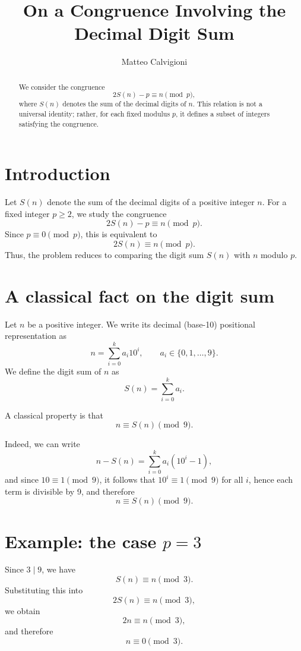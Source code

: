 \documentclass[11pt,a4paper]{article}
\title{On a Congruence Involving the Decimal Digit Sum}
\author{Matteo Calvigioni}
\date{}
\theoremstyle{definition}
\begin{document}
\maketitle

\begin{abstract}
We consider the congruence
\[
2S(n) - p \equiv n \pmod{p},
\]
where \(S(n)\) denotes the sum of the decimal digits of \(n\).
This relation is not a universal identity; rather, for each fixed modulus \(p\),
it defines a subset of integers satisfying the congruence.
\end{abstract}

\section{Introduction}

Let \(S(n)\) denote the sum of the decimal digits of a positive integer \(n\).
For a fixed integer \(p \ge 2\), we study the congruence
\[
2S(n) - p \equiv n \pmod{p}.
\]
Since \(p \equiv 0 \pmod{p}\), this is equivalent to
\[
2S(n) \equiv n \pmod{p}.
\]
Thus, the problem reduces to comparing the digit sum \(S(n)\) with \(n\) modulo \(p\).

\section{A classical fact on the digit sum}

Let \(n\) be a positive integer. We write its decimal (base-10) positional representation as
\[
n = \sum_{i=0}^{k} a_i 10^i, \qquad a_i \in \{0,1,\dots,9\}.
\]
We define the digit sum of \(n\) as
\[
S(n) = \sum_{i=0}^{k} a_i.
\]

A classical property is that
\[
n \equiv S(n) \pmod{9}.
\]

Indeed, we can write
\[
n - S(n) = \sum_{i=0}^{k} a_i (10^i - 1),
\]
and since \(10 \equiv 1 \pmod{9}\), it follows that \(10^i \equiv 1 \pmod{9}\) for all \(i\), hence each term is divisible by 9, and therefore
\[
n \equiv S(n) \pmod{9}.
\]

\section{Example: the case \(p = 3\)}

Since \(3 \mid 9\), we have
\[
S(n) \equiv n \pmod{3}.
\]
Substituting this into
\[
2S(n) \equiv n \pmod{3},
\]
we obtain
\[
2n \equiv n \pmod{3},
\]
and therefore
\[
n \equiv 0 \pmod{3}.
\]
\end{document}

